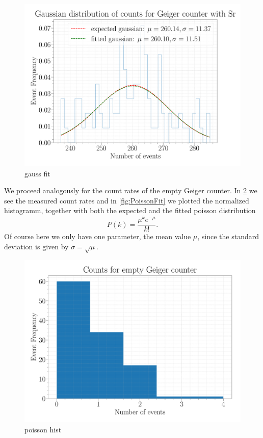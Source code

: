 \begin{figure}[H]
\centering
\includegraphics[width=\textwidth]{../Figures/Geiger_gauss_fit.pdf}
\caption{gauss fit}
\label{fig:GaussFit}
\end{figure}

We proceed analogously for the count rates of the empty Geiger counter. In \cref{fig:PoissonHist} we see the measured count rates and in \cref{fig:PoissonFit} we plotted the normalized histogramm, together with both the expected and the fitted poisson distribution
\begin{equation}
P(k) = \frac{\mu^k e^{-\mu}}{k!}.
\end{equation}
Of course here we only have one parameter, the mean value $\mu$, since the standard deviation is given by $\sigma = \sqrt{\mu}$.

\begin{figure}[H]
\centering
\includegraphics[width=\textwidth]{../Figures/Geiger_poisson_histogram.pdf}
\caption{poisson hist}
\label{fig:PoissonHist}
\end{figure}

